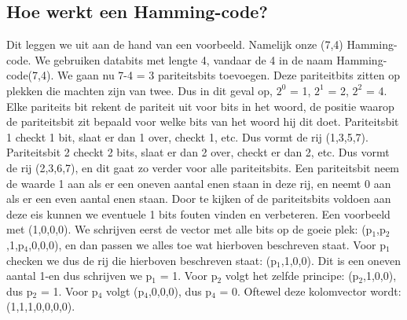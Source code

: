 \documentclass[a4paper]{article}
\begin{document}
\subsection{Hoe werkt een Hamming-code?}
Dit leggen we uit aan de hand van een voorbeeld. Namelijk onze (7,4) Hamming-code.
We gebruiken databits met lengte 4, vandaar de 4 in de naam Hamming-code(7,4). We gaan nu 7-4 = 3 pariteitsbits toevoegen. Deze pariteitbits zitten op plekken die machten zijn van twee. Dus in dit geval op, $2^0$ = 1, $2^1$ = 2, $2^2$ = 4. Elke pariteits bit rekent de pariteit uit voor bits in het woord, de positie waarop de pariteitsbit zit bepaald voor welke bits van het woord hij dit doet. Pariteitsbit 1 checkt 1 bit, slaat er dan 1 over, checkt 1, etc. Dus vormt de rij (1,3,5,7). Pariteitsbit 2 checkt 2 bits, slaat er dan 2 over, checkt er dan 2, etc. Dus vormt de rij (2,3,6,7), en dit gaat zo verder voor alle pariteitsbits. Een pariteitsbit neem de waarde 1 aan als er een oneven aantal enen staan in deze rij, en neemt 0 aan als er een even aantal enen staan. Door te kijken of de pariteitsbits voldoen aan deze eis kunnen we eventuele 1 bits fouten vinden en verbeteren. Een voorbeeld met (1,0,0,0). We schrijven eerst de vector met alle bits op de goeie plek: (p$_1$,p$_2$,1,p$_4$,0,0,0), en dan passen we alles toe wat hierboven beschreven staat. Voor p$_1$ checken we dus de rij die hierboven beschreven staat: (p$_1$,1,0,0). Dit is een oneven aantal 1-en dus schrijven we p$_1$ = 1. Voor p$_2$ volgt het zelfde principe: (p$_2$,1,0,0), dus p$_2$ = 1. Voor p$_4$ volgt (p$_4$,0,0,0), dus p$_4$ = 0. Oftewel deze kolomvector wordt: (1,1,1,0,0,0,0).
\end{document}
